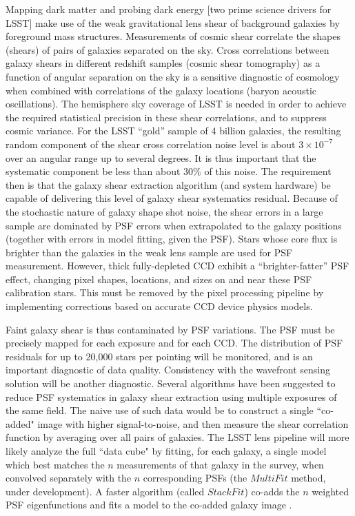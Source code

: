 \documentclass[SE,toc,lsstdraft]{lsstdoc}
\begin{document}
Mapping dark matter and probing dark energy [two prime science drivers for LSST] make use of the weak gravitational lens shear of background galaxies by foreground mass structures. Measurements of cosmic shear correlate the shapes (shears) of pairs of galaxies separated on the sky.  Cross correlations between galaxy shears in different redshift samples (cosmic shear tomography) as a function of angular separation on the sky is a sensitive diagnostic of cosmology when combined with correlations of the galaxy locations (baryon acoustic oscillations). The hemisphere sky coverage of LSST is needed in order to achieve the required statistical precision in these shear correlations, and to suppress cosmic variance.  For the LSST ``gold'' sample of 4 billion galaxies, the resulting random component of the shear cross correlation noise level is about $3\times10^{-7}$ over an angular range up to several degrees.  It is thus important that the systematic component be less than about 30\% of this noise.  The requirement then is that the galaxy shear extraction algorithm (and system hardware) be capable of delivering this level of galaxy shear systematics residual.  Because of the stochastic nature of galaxy shape shot noise, the shear errors in a large sample are dominated by PSF errors when extrapolated to the galaxy positions (together with errors in model fitting, given the PSF). Stars whose core flux is brighter than the galaxies in the weak lens sample are used for PSF measurement.  However, thick fully-depleted CCD exhibit a ``brighter-fatter'' PSF effect, changing pixel shapes, locations, and sizes on and near these PSF calibration stars. This must be removed by the pixel processing pipeline by implementing corrections based on accurate CCD device physics models.

Faint galaxy shear is thus contaminated by PSF variations. The PSF must be precisely mapped for each exposure and for each CCD. The distribution of PSF residuals for up to 20,000 stars per pointing will be monitored, and is an important diagnostic of data quality. Consistency with the wavefront sensing solution will be another diagnostic.  Several algorithms have been suggested to reduce PSF systematics in galaxy shear extraction using multiple exposures of the same field.  The naive use of such data would be to construct a single ``co-added" image with higher signal-to-noise, and then measure the shear correlation function by averaging over all pairs of galaxies.  The LSST lens pipeline will more likely analyze the full ``data cube" by fitting, for each galaxy, a single model which best matches the $n$ measurements of that galaxy in the survey, when convolved separately with the $n$ corresponding PSFs (the $MultiFit$ method, under development). A faster algorithm (called $StackFit$) co-adds the $n$ weighted PSF eigenfunctions and fits a model to the co-added galaxy image \citep{2011PASP..123..596J}.
\end{document}
